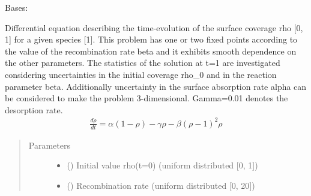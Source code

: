 \documentclass[letterpaper,10pt,english,openany,oneside]{sphinxmanual}
\begin{document}
\begin{fulllineitems}
\label{\detokenize{pygpc.testfunctions:pygpc.testfunctions.testfunctions.SurfaceCoverageSpecies}}
Bases: {\hyperref[\detokenize{pygpc:pygpc.AbstractModel.AbstractModel}]{}}

Differential equation describing the time-evolution of the surface coverage rho {[}0, 1{]} for a given species {[}1{]}.
This problem has one or two fixed points according to the value of the recombination rate beta and it exhibits
smooth dependence on the other parameters. The statistics of the solution at t=1 are investigated considering
uncertainties in the initial coverage rho\_0 and in the reaction parameter beta. Additionally uncertainty
in the surface absorption rate alpha can be considered to make the problem 3-dimensional.
Gamma=0.01 denotes the desorption rate.
\begin{equation*}
\begin{split}\frac{d\rho}{dt} = \alpha (1 - \rho) - \gamma \rho - \beta (\rho - 1)^2 \rho\end{split}
\end{equation*}\begin{quote}\begin{description}
\item[{Parameters}] \leavevmode\begin{itemize}
\item {} 
\sphinxstyleliteralstrong{\sphinxupquote{{[}}}\sphinxstyleliteralstrong{\sphinxupquote{{]}}} (\sphinxstyleliteralemphasis{\sphinxupquote{ {[}}}\sphinxstyleliteralemphasis{\sphinxupquote{{]}}}) \textendash{} Initial value rho(t=0) (uniform distributed {[}0, 1{]})

\item {} 
\sphinxstyleliteralstrong{\sphinxupquote{{[}}}\sphinxstyleliteralstrong{\sphinxupquote{{]}}} (\sphinxstyleliteralemphasis{\sphinxupquote{ {[}}}\sphinxstyleliteralemphasis{\sphinxupquote{{]}}}) \textendash{} Recombination rate (uniform distributed {[}0, 20{]})


\end{itemize}
\end{description}
\end{quote}
\end{fulllineitems}
\end{document}
